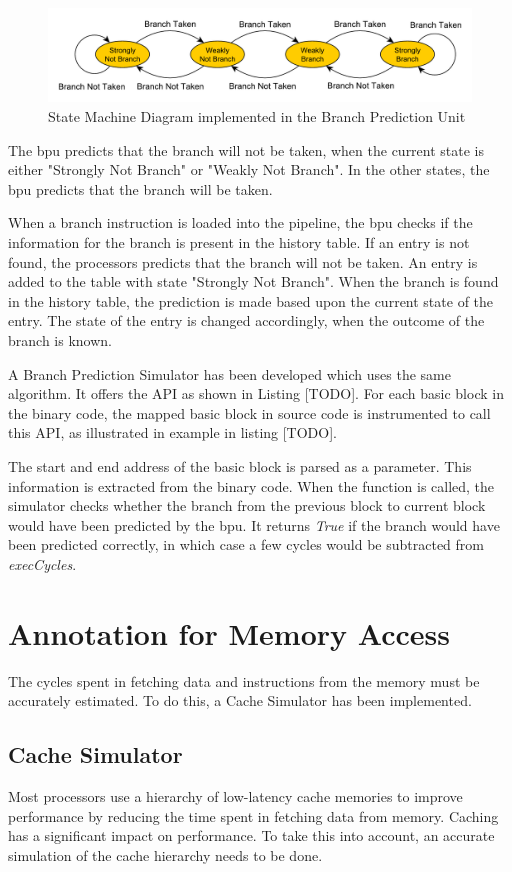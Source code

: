 \begin{figure}[h]
\centering
\includegraphics[width=.8\textwidth]{figures/BranchPredictionSMD.pdf}
\caption{State Machine Diagram implemented in the Branch Prediction Unit}
\label{fig:bpuSMD}
\end{figure}

The \gls{bpu} predicts that the branch will not be taken, when the current state is either "Strongly Not Branch" or "Weakly Not Branch". In the other states, the \gls{bpu} predicts that the branch will be taken.

When a branch instruction is loaded into the pipeline, the \gls{bpu} checks if the information for the branch is present in the history table. If an entry is not found, the processors predicts that the branch will not be taken. An entry is added to the table with state "Strongly Not Branch". When the branch is found in the history table, the prediction is made based upon the current state of the entry. The state of the entry is changed accordingly, when the outcome of the branch is known.

A Branch Prediction Simulator has been developed which uses the same algorithm. It offers the API as shown in Listing [TODO]. For each basic block in the binary code, the mapped basic block in source code is instrumented to call this API, as illustrated in example in listing [TODO]. 

The start and end address of the basic block is parsed as a parameter. This information is extracted from the binary code. When the function is called, the simulator checks whether the branch from the previous block to current block would have been predicted by the \gls{bpu}. It returns \emph{True} if the branch would have been predicted correctly, in which case a few cycles would be subtracted from \emph{execCycles}. 

\section{Annotation for Memory Access}
The cycles spent in fetching data and instructions from the memory must be accurately estimated. To do this, a Cache Simulator has been implemented. 

\subsection{Cache Simulator}
Most processors use a hierarchy of low-latency cache memories to improve performance by reducing the time spent in fetching data from memory. Caching has a significant impact on performance. To take this into account, an accurate simulation of the cache hierarchy needs to be done.

